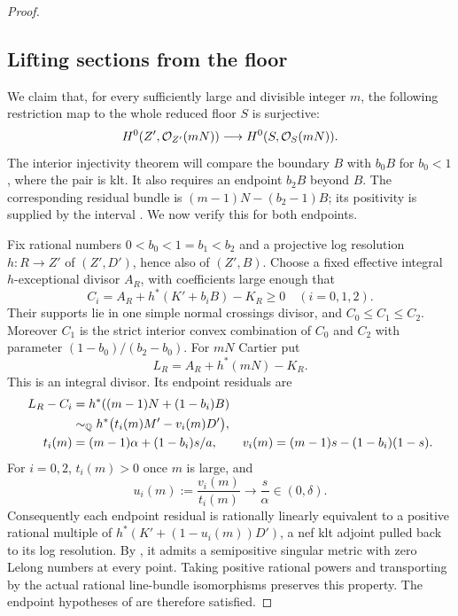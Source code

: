 \begin{proof}
\subsection*{Lifting sections from the floor}

We claim that, for every sufficiently large and divisible integer $m$,
the following restriction map to the whole reduced floor $S$ is surjective:
\begin{equation}
\label{eq:signed-section-surjection}
 H^0(Z',\mathcal O_{Z'}(mN))\longrightarrow H^0(S,\mathcal O_S(mN)).
\end{equation}
The interior injectivity theorem will compare the boundary $B$
with $b_0B$ for $b_0<1$, where the pair is klt. It also requires
an endpoint $b_2B$ beyond $B$. The corresponding residual bundle
is $(m-1)N-(b_2-1)B$; its positivity is supplied by the interval
. We now verify this for both endpoints.

Fix rational numbers $0<b_0<1=b_1<b_2$ and a projective
log resolution $h:R\to Z'$ of $(Z',D')$, hence also of $(Z',B)$.
Choose a fixed
effective integral $h$-exceptional divisor $A_R$, with coefficients
large enough that
\[
 C_i=A_R+h^*(K'+b_iB)-K_R\geq0\quad(i=0,1,2).
\]
Their supports lie in one simple normal crossings divisor, and
$C_0\leq C_1\leq C_2$. Moreover $C_1$ is the strict interior convex
combination of $C_0$ and $C_2$ with parameter
$(1-b_0)/(b_2-b_0)$. For $mN$ Cartier put
\[
 L_R=A_R+h^*(mN)-K_R.
\]
This is an integral divisor. Its endpoint residuals are
\begin{align}
 L_R-C_i
 &=h^*((m-1)N+(1-b_i)B) \notag\\
 &\sim_{\mathbb Q}h^*\bigl(t_i(m)M'-v_i(m)D'\bigr),
 \label{eq:signed-endpoint-residuals}\\
 t_i(m)&=(m-1)\alpha+(1-b_i)s/a,\qquad
 v_i(m)=(m-1)s-(1-b_i)(1-s). \notag
\end{align}
For $i=0,2$, $t_i(m)>0$ once $m$ is large, and
\[
 u_i(m):=\frac{v_i(m)}{t_i(m)}\longrightarrow\frac{s}{\alpha}
 \in(0,\delta).
\]
Consequently each endpoint residual is rationally linearly
equivalent to a positive rational multiple of
$h^*(K'+(1-u_i(m))D')$, a nef klt adjoint pulled back to its log
resolution. By , it admits a semipositive
singular metric with zero Lelong numbers at every point. Taking
positive rational powers and transporting by the actual rational
line-bundle isomorphisms preserves this property. The endpoint
hypotheses of  are therefore satisfied.


\end{proof}
